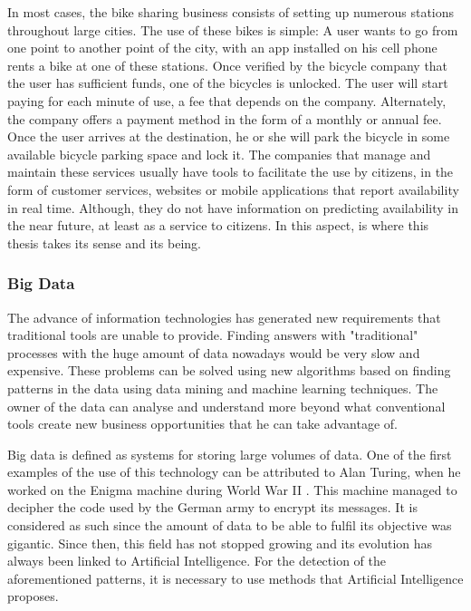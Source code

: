 In most cases, the bike sharing business consists of setting up numerous stations throughout large cities. The use of these bikes is simple: A user wants to go from one point to another point of the city, with an app installed on his cell phone rents a bike at one of these stations. Once verified by the bicycle company that the user has sufficient funds, one of the bicycles is unlocked. The user will start paying for each minute of use, a fee that depends on the company. Alternately, the company offers a payment method in the form of a monthly or annual fee. Once the user arrives at the destination, he or she will park the bicycle in some available bicycle parking space and lock it. The companies that manage and maintain these services usually have tools to facilitate the use by citizens, in the form of customer services, websites or mobile applications that report availability in real time. Although, they do not have information on predicting availability in the near future, at least as a service to citizens. In this aspect, is where this thesis takes its sense and its being.
\newline



\subsubsection{Big Data}

The advance of information technologies has generated new requirements that traditional tools are unable to provide. Finding answers with "traditional" processes with the huge amount of data nowadays would be very slow and expensive. These problems can be solved using new algorithms based on finding patterns in the data using data mining and machine learning techniques. The owner of the data can analyse and understand more beyond what conventional tools create new business opportunities that he can take advantage of.
\newline

Big data is defined as systems for storing large volumes of data. One of the first examples of the use of this technology can be attributed to Alan Turing, when he worked on the Enigma machine during World War II \cite{alan_turing}. This machine managed to decipher the code used by the German army to encrypt its messages. It is considered as such since the amount of data to be able to fulfil its objective was gigantic. Since then, this field has not stopped growing and its evolution has always been linked to Artificial Intelligence. For the detection of the aforementioned patterns, it is necessary to use methods that Artificial Intelligence proposes.
\newline

